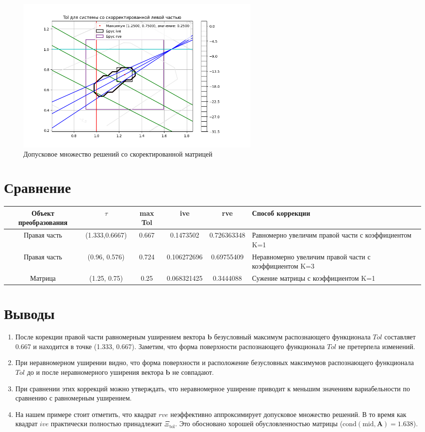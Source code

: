 \documentclass[a4paper,14pt]{article}
\begin{document}
	\begin{figure}[H]
		\centering
		\includegraphics[width=0.6\textwidth]{../src/pic/left_bliz.png}
		\caption{Допусковое множество решений со скоректированной матрицей} 
		\label{fig:MatrixCorrSetBliz}
	\end{figure}
	\section{Сравнение}
	\begin{center}
		\begin{tabularx}{\textwidth}{|c|c|c|c|c|X|}  
			\hline
			Объект преобразования & $\tau$ & max Tol & ive & rve & Способ коррекции \\ \hline\hline
			Правая часть & (1.333,0.6667) & 0.667 & 0.1473502 & 0.726363348 & Равномерно увеличим правой части с коэффициентом K=1 \\ \hline
			Правая часть & (0.96, 0.576) & 0.724 & 0.106272696 & 0.69755409& Неравномерно увеличим правой части с коэффициентом K=3\\ \hline
			Матрица & (1.25, 0.75) & 0.25 & 0.068321425 & 0.3444088 & Сужение матрицы с коэффициентом K=1 \\ \hline
		\end{tabularx}
	\end{center}

	\section{Выводы}
	\begin{enumerate}
		\item После корекции правой части равномерным уширением вектора $\textbf{b}$ безусловный максимум распознающего функционала $Tol$ составляет 0.667 и находится в точке (1.333, 0.667). Заметим, что форма поверхности распознающего функционала $Tol$ не претерпела изменений.
		\item При неравномерном уширении видно, что форма поверхности и расположение безусловных максимумов распознающего функционала $Tol$ до и после неравномерного уширения вектора $\textbf{b}$ не совпадают.
		\item При сравнении этих коррекций можно утверждать, что неравномерное уширение приводит к меньшим значениям вариабельности по сравнению с равномерным уширением.
		\item На нашем примере стоит отметить, что квадрат $rve$ неэффективно аппроксимирует допусковое множество решений. В то время как квадрат $ive$ практически полностью принадлежит $\Xi_{\mathrm{tol}}$. Это обосновано хорошей обусловленностью матрицы ($\mathrm{cond}(\mathrm{mid},\mathbf{A})=1.638$).
	\end{enumerate}
	
\end{document}
